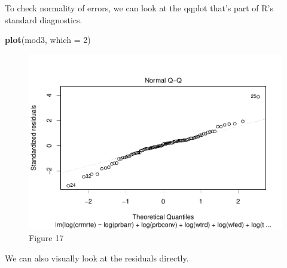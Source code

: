 \documentclass[]{article}
\newenvironment{Shaded}{\begin{snugshade}}{\end{snugshade}}
\newcommand{\DataTypeTok}[1]{\textcolor[rgb]{0.13,0.29,0.53}{#1}}
\newcommand{\DecValTok}[1]{\textcolor[rgb]{0.00,0.00,0.81}{#1}}
\newcommand{\KeywordTok}[1]{\textcolor[rgb]{0.13,0.29,0.53}{\textbf{#1}}}
\newcommand{\NormalTok}[1]{#1}
\newcommand{\OperatorTok}[1]{\textcolor[rgb]{0.81,0.36,0.00}{\textbf{#1}}}
\newcommand{\StringTok}[1]{\textcolor[rgb]{0.31,0.60,0.02}{#1}}
\begin{document}
To check normality of errors, we can look at the qqplot that's part of
R's standard diagnostics.

\begin{Shaded}
\begin{Highlighting}[]
\KeywordTok{plot}\NormalTok{(mod3, }\DataTypeTok{which =} \DecValTok{2}\NormalTok{)}
\end{Highlighting}
\end{Shaded}

\begin{figure}

{\centering \includegraphics{lab_3_final_files/figure-latex/unnamed-chunk-49-1} 

}

\caption{Figure 17}\label{fig:unnamed-chunk-49}
\end{figure}

We can also visually look at the residuals directly.

\begin{Shaded}
\end{Shaded}
\end{document}
